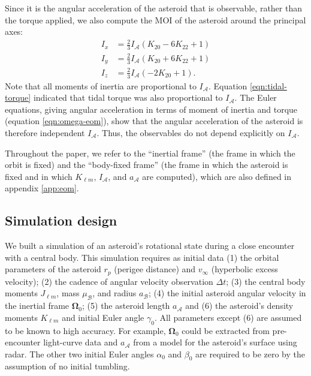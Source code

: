 \documentclass[fleqn,usenatbib]{mnras}
\newcommand{\parens}[1]{\left( #1 \right)}
\begin{document}
Since it is the angular acceleration of the asteroid that is observable, rather than the torque applied, we also compute the MOI of the asteroid around the principal axes: 
\begin{equation}
  \begin{split}
    I_x &= \frac{2}{3} I_\mathcal{A} \parens{K_{20} - 6 K_{22} + 1}\\
    I_y &= \frac{2}{3} I_\mathcal{A} \parens{K_{20} + 6 K_{22} + 1}\\
    I_z &= \frac{2}{3} I_\mathcal{A} \parens{-2K_{20} + 1}.
  \end{split}
  \label{eqn:moi}
\end{equation}
Note that all moments of inertia are proportional to $I_\mathcal{A}$. Equation \ref{eqn:tidal-torque} indicated that tidal torque was also proportional to $I_\mathcal{A}$. The Euler equations, giving angular acceleration in terms of moment of inertia and torque (equation \ref{eqn:omega-eom}), show that the angular acceleration of the asteroid is therefore independent $I_\mathcal{A}$. Thus, the observables do not depend explicitly on $I_\mathcal{A}$.

Throughout the paper, we refer to the ``inertial frame'' (the frame in which the orbit is fixed) and the ``body-fixed frame'' (the frame in which the asteroid is fixed and in which $K_{\ell m}$, $I_\mathcal{A}$, and $a_\mathcal{A}$ are computed), which are also defined in appendix \ref{app:eom}.

\subsection{Simulation design}
\label{sec:sim}

We built a simulation of an asteroid's rotational state during a close encounter with a central body. This simulation requires as initial data (1) the orbital parameters of the asteroid $r_p$ (perigee distance) and $v_\infty$ (hyperbolic excess velocity); (2) the cadence of angular velocity observation $\Delta t$; (3) the central body moments $J_{\ell m}$, mass $\mu_\mathcal{B}$, and radius $a_\mathcal{B}$; (4) the initial asteroid angular velocity in the inertial frame $\bm \Omega_0$; (5) the asteroid length $a_\mathcal{A}$ and (6) the asteroid's density moments $K_{\ell m}$ and initial Euler angle $\gamma_0$. All parameters except (6) are assumed to be known to high accuracy. For example, $\bm \Omega_0$ could be extracted from pre-encounter light-curve data and $a_\mathcal{A}$ from a model for the asteroid's surface using radar. The other two initial Euler angles $\alpha_0$ and $\beta_0$ are required to be zero by the assumption of no initial tumbling.
\end{document}
